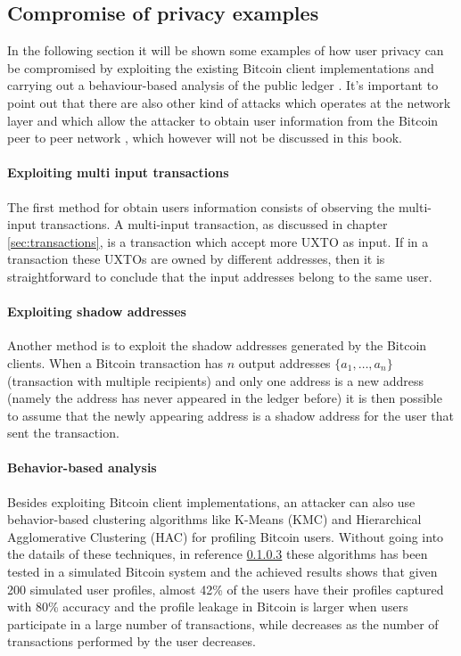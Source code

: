 \subsection{Compromise of privacy examples} In the following section it will be
shown some examples of how user privacy can be compromised by exploiting the
existing Bitcoin client implementations and carrying out a behaviour-based
analysis of the public ledger \cite{karame2016bitcoin}. It's important to point
out that there are also other kind of attacks which operates at the network
layer and which allow the attacker to obtain user information from the Bitcoin
peer to peer network \cite{karame2016bitcoin}, which however will not be
discussed in this book.

\paragraph{Exploiting multi input transactions} The first method for obtain
users information consists of observing the multi-input transactions. A
multi-input transaction, as discussed in chapter \ref{sec:transactions}, is a
transaction which accept  more UXTO as input. If in a transaction these UXTOs
are owned by different addresses, then it is straightforward to conclude that
the input addresses belong to the same user.

\paragraph{Exploiting shadow addresses} Another method is to exploit the shadow
addresses generated by the Bitcoin clients. When a Bitcoin transaction has $n$
output addresses $\{a_1 , \dots, a_n \}$ (transaction with multiple recipients)
and only one address is a new address (namely the address has never appeared in
the ledger before) it is then possible to assume that the newly appearing
address is a shadow address for the user that sent the transaction.

\paragraph{Behavior-based analysis} Besides exploiting Bitcoin client
implementations, an attacker can also use behavior-based clustering algorithms
like K-Means (KMC) and Hierarchical Agglomerative Clustering (HAC) for profiling
Bitcoin users. Without going into the datails of these techniques, in reference
\ref{} these algorithms has been tested in a simulated Bitcoin system and the
achieved results shows that given 200 simulated user profiles, almost 42\% of
the users have their profiles captured with 80\% accuracy and the profile
leakage in Bitcoin is larger when users participate in a large number of
transactions, while decreases as the number of transactions performed by the
user decreases.
